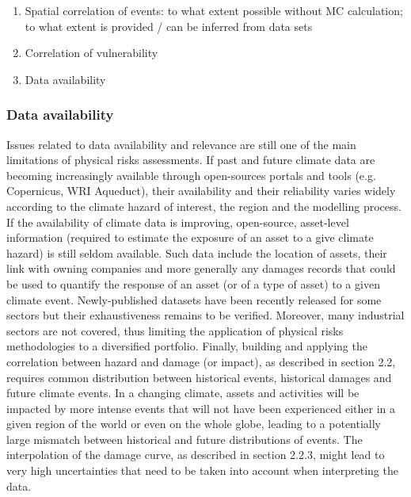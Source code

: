 \documentclass[a4paper,11pt]{extarticle} %
\theoremstyle{definition}
\begin{document}
\begin{enumerate}
    \item Spatial correlation of events: to what extent possible without MC calculation; to what extent is provided / can be inferred from data sets
    \item Correlation of vulnerability
    \item Data availability
\end{enumerate}


\subsubsection{Data availability}
Issues related to data availability and relevance are still one of the main limitations of physical risks assessments. If past and future climate data are becoming increasingly available through open-sources portals and tools (e.g. Copernicus, WRI Aqueduct), their availability and their reliability varies widely according to the climate hazard of interest, the region and the modelling process. If the availability of climate data is improving, open-source, asset-level information (required to estimate the exposure of an asset to a give climate hazard) is still seldom available. Such data include the location of assets, their link with owning companies and more generally any damages records that could be used to quantify the response of an asset (or of a type of asset) to a given climate event. Newly-published datasets have been recently released for some sectors but their exhaustiveness remains to be verified. Moreover, many industrial sectors are not covered, thus limiting the application of physical risks methodologies to a diversified portfolio.
Finally, building and applying the correlation between hazard and damage (or impact), as described in section 2.2, requires common distribution between historical events, historical damages and future climate events. In a changing climate, assets and activities will be impacted by more intense events that will not have been experienced either in a given region of the world or even on the
whole globe, leading to a potentially large mismatch between historical and future distributions of events. The interpolation of the damage curve, as described in section 2.2.3, might lead to very high uncertainties that need to be taken into account when interpreting the data.



\end{document}
